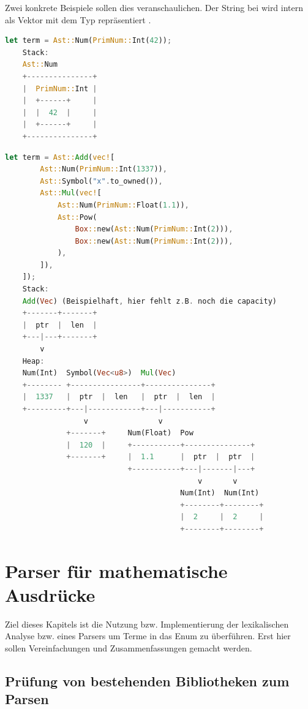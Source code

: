 \documentclass[11pt,a4paper, ngerman]{article}
\begin{document}
Zwei konkrete Beispiele sollen dies veranschaulichen. Der String bei  wird intern als Vektor mit dem Typ  repräsentiert \cite{StringSrc}.
\begin{lstlisting}[language=rust, caption={Term 1 Stack und Heap}]
    let term = Ast::Num(PrimNum::Int(42));
    Stack:
    Ast::Num
    +---------------+
    |  PrimNum::Int |
    |  +------+     |
    |  |  42  |     |
    |  +------+     |
    +---------------+
\end{lstlisting}

\begin{lstlisting}[language=rust, caption={Term 2 Stack und Heap}]
    let term = Ast::Add(vec![
        Ast::Num(PrimNum::Int(1337)),
        Ast::Symbol("x".to_owned()),
        Ast::Mul(vec![
            Ast::Num(PrimNum::Float(1.1)),
            Ast::Pow(
                Box::new(Ast::Num(PrimNum::Int(2))),
                Box::new(Ast::Num(PrimNum::Int(2))),
            ),
        ]),
    ]);
    Stack:
    Add(Vec) (Beispielhaft, hier fehlt z.B. noch die capacity)
    +-------+-------+
    |  ptr  |  len  |
    +---|---+-------+
        v
    Heap:
    Num(Int)  Symbol(Vec<u8>)  Mul(Vec)
    +-------- +----------------+---------------+
    |  1337   |  ptr  |  len   |  ptr  |  len  |
    +---------+---|------------+---|-----------+
                  v                v
              +-------+     Num(Float)  Pow
              |  120  |     +-----------+---------------+
              +-------+     |  1.1      |  ptr  |  ptr  |
                            +-----------+---|-------|---+
                                            v       v
                                        Num(Int)  Num(Int)
                                        +--------+--------+
                                        |  2     |  2     |
                                        +--------+--------+
\end{lstlisting}

\newpage

\section{Parser für mathematische Ausdrücke}
Ziel dieses Kapitels ist die Nutzung bzw. Implementierung der lexikalischen Analyse bzw. eines Parsers um Terme in das Enum  zu überführen. Erst hier sollen Vereinfachungen und Zusammenfassungen gemacht werden. 
\subsection{Prüfung von bestehenden Bibliotheken zum Parsen}
\end{document}
